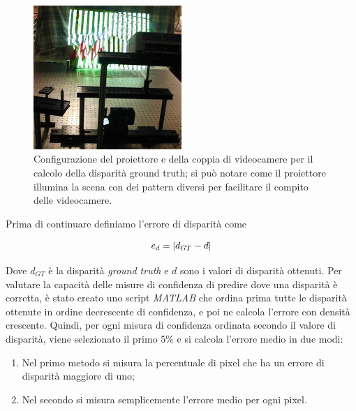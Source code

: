 \documentclass[12pt]{report}
\DeclarePairedDelimiter{\abs}{\lvert}{\rvert}    %
\begin{document}
		\begin{figure}
			\includegraphics[width=0.5\textwidth]{./figures/ground_truth.png}
			\caption{Configurazione del proiettore e della coppia di videocamere per il calcolo della disparità ground truth; si può notare come il proiettore illumina la scena con dei pattern diversi per facilitare il compito delle videocamere.}
			\label{fig:groundtruth}
		\end{figure}
		
		\noindent Prima di continuare definiamo l'errore di disparità come
		
		\begin{equation}
			e_{d}=\abs{d_{GT}-d}
			\label{eq:errore}
		\end{equation} 
		
		\noindent Dove $d_{GT}$ è la disparità \textit{ground truth} e $d$ sono i valori di disparità ottenuti. \newline Per valutare la capacità delle misure di confidenza di predire dove una disparità è corretta, è stato creato uno script \textit{MATLAB} che ordina prima tutte le disparità ottenute in ordine decrescente di confidenza, e poi ne calcola l'errore con densità crescente. Quindi, per ogni misura di confidenza ordinata secondo il valore di disparità, viene selezionato il primo 5\% e si calcola l'errore medio in due modi:  
		
		\begin{enumerate}
			\item Nel primo metodo si misura la percentuale di pixel che ha un errore di disparità maggiore di uno;
			
			\item Nel secondo si misura semplicemente l'errore medio per ogni pixel.
			
			\label{enum:errore}
		\end{enumerate}
				
\end{document}

